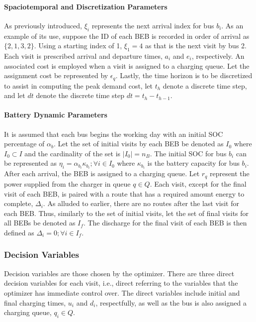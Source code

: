 \documentclass[energies,article,submit,moreauthors]{Definitions/mdpi}
\newcommand{\Iset}{I}                       %
\newcommand{\Isetinit}{I_0}                 %
\newcommand{\Isetfinal}{I_f}                %
\newcommand{\Qset}{Q}                       %
\begin{document}
\paragraph{Spaciotemporal and Discretization Parameters}
\label{sec:sa-packing-and-discretization-paramaters}
As previously introduced, \(\xi_i\) represents the next arrival index for bus \(b_i\). As an example of its use, suppose the
ID of each BEB is recorded in order of arrival as \(\{ 2,1,3,2 \}\). Using a starting index of 1, \(\xi_1 = 4\) as that is the
next visit by bus 2. Each visit is prescribed arrival and departure times, \(a_i\) and \(e_i\), respectively. An associated
cost is employed when a visit is assigned to a charging queue. Let the assignment cost be represented by \(\epsilon_q\). Lastly,
the time horizon is to be discretized to assist in computing the peak demand cost, let \(t_h\) denote a discrete time
step, and let \(dt\) denote the discrete time step \(dt = t_h - t_{h-1}\).

\paragraph{Battery Dynamic Parameters}
\label{sec:sa-battery-dynamic-parameters}
It is assumed that each bus begins the working day with an initial SOC percentage of \(\alpha_b\). Let the set of initial
visits by each BEB be denoted as \(\Isetinit\) where \(\Isetinit \subset \Iset\) and the cardinality of the set is \(\lvert
\Isetinit \rvert = n_B\). The initial SOC for bus \(b_i\) can be represented as \(\eta_{i} = \alpha_{b_i}\kappa_{b_i}; \forall i \in \Isetinit\)
where \(\kappa_{b_i}\) is the battery capacity for bus \(b_i\). After each arrival, the BEB is assigned to a charging queue. Let
\(r_q\) represent the power supplied from the charger in queue \(q \in Q\). Each visit, except for the final visit of each
BEB, is paired with a route that has a required amount energy to complete, \(\Delta_i\). As alluded to earlier, there are no
routes after the last visit for each BEB. Thus, similarly to the set of initial visits, let the set of final visits for
all BEBs be denoted as \(\Isetfinal\). The discharge for the final visit of each BEB is then defined as \(\Delta_{i} = 0; \forall i \in
\Isetfinal\).

\subsubsection{Decision Variables}
\label{sec:sa-decision-variables}
Decision variables are those chosen by the optimizer. There are three direct decision variables for each visit, i.e.,
direct referring to the variables that the optimizer has immediate control over. The direct variables include initial
and final charging times, \(u_i\) and \(d_i\), respectfully, as well as the bus is also assigned a charging queue, \(q_i \in
\Qset\).
\end{document}
